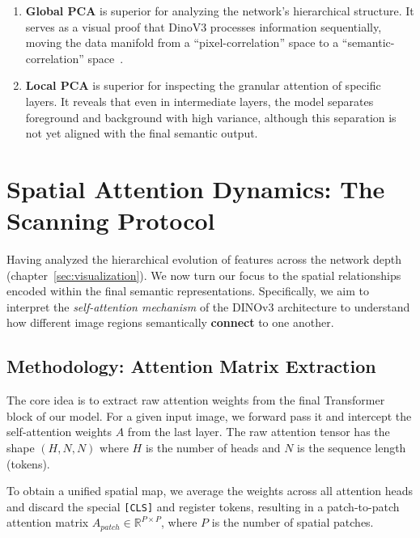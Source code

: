 \documentclass[oneside]{ctuthesis}
\begin{document}
\begin{enumerate}
    \item \textbf{Global PCA} is superior for analyzing the network's hierarchical structure. It serves as a visual proof that DinoV3 processes information sequentially, moving the data manifold from a ``pixel-correlation'' space to a ``semantic-correlation'' space~\cite{siméoni2025dinov3}.
    \item \textbf{Local PCA} is superior for inspecting the granular attention of specific layers. It reveals that even in intermediate layers, the model separates foreground and background with high variance, although this separation is not yet aligned with the final semantic output.
\end{enumerate}

\section{Spatial Attention Dynamics: The Scanning Protocol}
Having analyzed the hierarchical evolution of features across the network depth (chapter~\ref{sec:visualization}). We now turn our focus to the spatial relationships encoded within the final semantic representations. Specifically, we aim to interpret the \textit{self-attention mechanism} of the DINOv3 architecture to understand how different image regions semantically \textbf{connect} to one another.

\subsection{Methodology: Attention Matrix Extraction}
The core idea is to extract raw attention weights from the final Transformer block of our model. For a given input image, we forward pass it and intercept the 
self-attention weights $A$ from the last layer. The raw attention tensor has the shape $(H, N, N)$ where $H$ is the number of heads and $N$ is the sequence length (tokens).

To obtain a unified spatial map, we average the weights across all attention heads and discard the special \texttt{[CLS]} and register tokens, resulting in a patch-to-patch attention matrix $A_{patch} \in \mathbb{R}^{P \times P}$, where $P$ is the number of spatial patches.
\end{document}
